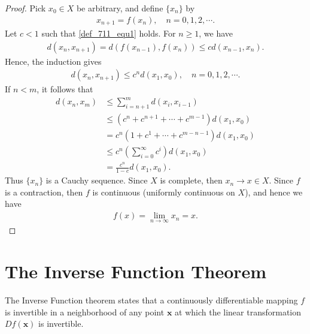 \documentclass[10pt]{book}
\theoremstyle{definition}
\numberwithin{equation}{chapter}
\begin{document}
\begin{proof}
Pick $x_0 \in X$ be arbitrary, and define $\{x_n\}$ by 
\begin{align*}
    x_{n+1} = f(x_n), \quad n = 0,1,2,\cdots.
\end{align*}
Let $c < 1$ such that \eqref{def_711_equ1} holds. For $n \geq 1$, we have
\begin{align*}
    d(x_n,x_{n+1}) = d(f(x_{n-1}),f(x_n)) \leq c d(x_{n-1},x_n).
\end{align*}
Hence, the induction gives
\begin{align*}
    d(x_n,x_{n+1}) \leq c^n d(x_1, x_0), \quad n = 0,1,2,\cdots.
\end{align*}
If $n < m$, it follows that
\begin{align*}
    d(x_n,x_m) & \leq \sum^m_{i=n+1} d(x_i,x_{i-1}) \\
    & \leq \left(c^n + c^{n+1} + \cdots + c^{m-1}\right) d(x_1,x_0) \\
    & = c^n \left(1 + c^1 + \cdots + c^{m-n-1}\right) d(x_1,x_0) \\
    & \leq c^n \left(\sum^\infty_{i=0} c^i \right) d(x_1,x_0)  \\
    & = \frac{c^n}{1 - c} d(x_1,x_0).
\end{align*}
Thus $\{x_n\}$ is a Cauchy sequence. Since $X$ is complete, then $x_n \to x \in X$. Since $f$ is a contraction, then $f$ is continuous (uniformly continuous on $X$), and hence we have
\begin{align*}
    f(x) = \lim_{n\to\infty} x_n = x.
\end{align*}
\end{proof}

\medskip


\section{The Inverse Function Theorem}

The Inverse Function theorem states that a continuously differentiable mapping $f$ is invertible in a neighborhood of any point $\mathbf{x}$ at which the linear transformation $Df(\mathbf{x})$ is invertible.

\medskip
\end{document}
